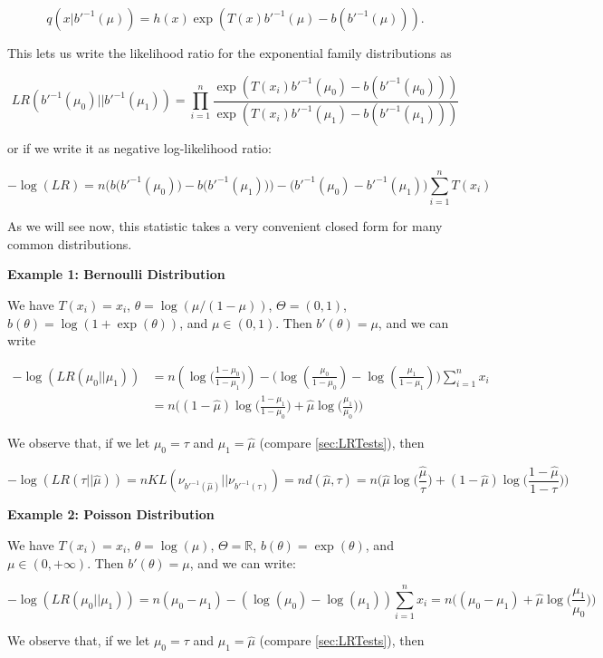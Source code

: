 \documentclass[11pt,]{article}
\begin{document}
\[
q(x|b'^{-1}(\mu)) = h(x) \exp(T(x) b'^{-1}(\mu) - b(b'^{-1}(\mu))).
\]

This lets us write the likelihood ratio for the exponential family
distributions as

\[
LR(b'^{-1}(\mu_0)||b'^{-1}(\mu_1)) = \prod_{i=1}^n \frac{\exp(T(x_i) b'^{-1}(\mu_0) - b(b'^{-1}(\mu_0)))}{\exp(T(x_i) b'^{-1}(\mu_1) - b(b'^{-1}(\mu_1)))}
\]

or if we write it as negative log-likelihood ratio:

\[
-\log(LR) = n\Big(b\big(b'^{-1}(\mu_0)) - b(b'^{-1}(\mu_1)\big)\Big) - \Big(b'^{-1}(\mu_0)-b'^{-1}(\mu_1)\Big)\sum_{i=1}^nT(x_i)
\]

As we will see now, this statistic takes a very convenient closed form
for many common distributions.

\textbf{Example 1: Bernoulli Distribution}

We have \(T(x_i) = x_i\), \(\theta = \log(\mu/(1-\mu))\),
\(\Theta = (0,1)\), \(b(\theta) = \log(1+\exp(\theta))\), and
\(\mu \in (0,1)\). Then \(b'(\theta) = \mu\), and we can write

\begin{align*}
-\log(LR(\mu_0||\mu_1)) & = n(\log\Big(\frac{1-\mu_0}{1-\mu_1}\Big)) - \Big(\log(\frac{\mu_0}{1-\mu_0}) - \log(\frac{\mu_1}{1-\mu_1})\Big)\sum_{i=1}^{n}x_i \\
& = n \Big( (1-\hat{\mu})\log\Big(\frac{1-\mu_1}{1-\mu_0}\Big) + \hat{\mu}\log\Big(\frac{\mu_1}{\mu_0}) \Big)
\end{align*}

We observe that, if we let \(\mu_0 = \tau\) and \(\mu_1 = \hat{\mu}\)
(compare \autoref{sec:LRTests}), then

\[
-\log(LR(\tau||\hat{\mu})) = nKL(\nu_{b'^{-1}(\hat{\mu})}||\nu_{b'^{-1}(\tau)}) = nd(\hat{\mu},\tau) = n \Big(\hat{\mu}\log\big(\frac{\hat{\mu}}{\tau}\big) + (1-\hat{\mu})\log\big(\frac{1-\hat{\mu}}{1-\tau}\big)\Big)
\]

\textbf{Example 2: Poisson Distribution}

We have \(T(x_i) = x_i\), \(\theta = \log(\mu)\),
\(\Theta = \mathbb{R}\), \(b(\theta) = \exp(\theta)\), and
\(\mu \in (0, +\infty)\). Then \(b'(\theta) = \mu\), and we can write:

\[
-\log(LR(\mu_0||\mu_1)) = n(\mu_0 - \mu_1) - (\log(\mu_0) - \log(\mu_1))\sum_{i=1}^n x_i = n\Big((\mu_0 - \mu_1) + \hat{\mu}\log\Big(\frac{\mu_1}{\mu_0}\Big)\Big)
\]

We observe that, if we let \(\mu_0 = \tau\) and \(\mu_1 = \hat{\mu}\)
(compare \autoref{sec:LRTests}), then
\end{document}
